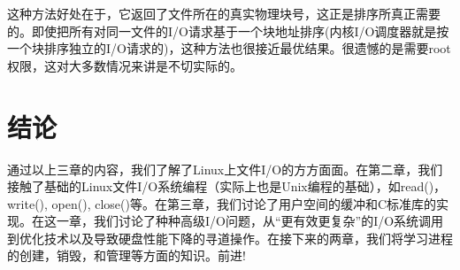 这种方法好处在于，它返回了文件所在的真实物理块号，这正是排序所真正需要的。即使把所有对同一文件的I/O请求基于一个块地址排序(内核I/O调度器就是按一个块排序独立的I/O请求的)，这种方法也很接近最优结果。很遗憾的是需要root权限，这对大多数情况来讲是不切实际的。

\section{结论}

通过以上三章的内容，我们了解了Linux上文件I/O的方方面面。在第二章，我们接触了基础的Linux文件I/O系统编程（实际上也是Unix编程的基础），如read()，write(), open(), close()等。在第三章，我们讨论了用户空间的缓冲和C标准库的实现。在这一章，我们讨论了种种高级I/O问题，从“更有效更复杂”的I/O系统调用到优化技术以及导致硬盘性能下降的寻道操作。在接下来的两章，我们将学习进程的创建，销毁，和管理等方面的知识。前进!

